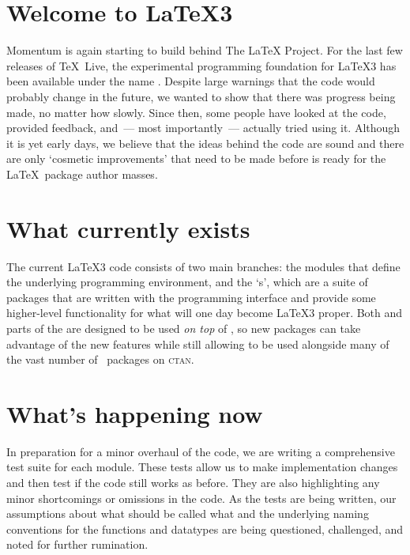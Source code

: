 \documentclass{ltnews}
\begin{document}
\maketitle

\section{Welcome to \LaTeX3}

Momentum is again starting to build behind The \LaTeX{} Project. For the
last few releases of \TeX~Live, the experimental programming foundation for
\LaTeX3 has been available under the name . Despite large
warnings that the code would probably change in the future, we wanted to show
that there was progress being made, no matter how slowly. Since then, some
people have looked at the code, provided feedback, and~--- most
importantly~--- actually tried using it. Although it is yet early days, we
believe that the ideas behind the code are sound and there are only `cosmetic
improvements' that need to be made before  is ready for the
\LaTeX~package author masses.

\section{What currently exists}

The current \LaTeX3 code consists of two main branches: the
 modules that define the underlying programming environment,
and the `s', which are a suite of packages that are written
with the  programming interface and provide some higher-level
functionality for what will one day become \LaTeX3 proper. Both  and
parts of the  are designed to be used \emph{on top} of
\LaTeXe, so new packages can take advantage of the new features while still
allowing to be used alongside many of the vast number of \LaTeXe\ packages on
\textsc{ctan}.

\section{What's happening now}

In preparation for a minor overhaul of the  code, we are
writing a comprehensive test suite for each module. These tests allow us to
make implementation changes and then test if the code still works as before.
They are also highlighting any minor shortcomings or omissions in the code.
As the tests are being written, our assumptions about what should be called
what and the underlying naming conventions for the functions and datatypes are
being questioned, challenged, and noted for further rumination.
\end{document}
